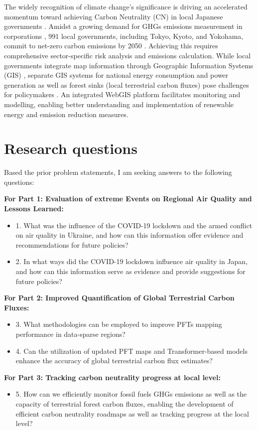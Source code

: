 The widely recognition of climate change's significance \citep{primack2009impact, watanabe2009general, ogawa2013ecological, shibuya2016effect} is driving an accelerated momentum toward achieving Carbon Neutrality (CN) in local Japanese governments \citep{nakazawa2023net}. Amidst a growing demand for GHGs emissions measurement in corporations \citep{kauffmann2012corporate}, 991 local governments, including Tokyo, Kyoto, and Yokohama, commit to net-zero carbon emissions by 2050 \citep{zerocarboncities}. Achieving this requires comprehensive sector-specific risk analysis and emissions calculation. While local governments integrate map information through Geographic Information Systems (GIS) \citep{nikkei}, separate GIS systems for national energy consumption and power generation as well as forest sinks (local terrestrial carbon fluxes) pose challenges for policymakers \citep{Toshihiko, kitamoto, nlftp}. An integrated WebGIS platform facilitates monitoring and modelling, enabling better understanding and implementation of renewable energy and emission reduction measures. \par
\section{Research questions}
Based the prior problem statements, I am seeking answers to the following questions:

\textbf{For Part 1: Evaluation of extreme Events on Regional Air Quality and Lessons Learned:}
\begin{itemize}
    \item 1. What was the influence of the COVID-19 lockdown and the armed conflict on air quality in Ukraine, and how can this information offer evidence and recommendations for future policies?
    \item 2. In what ways did the COVID-19 lockdown influence air quality in Japan, and how can this information serve as evidence and provide suggestions for future policies?
\end{itemize}

\textbf{For Part 2: Improved Quantification of Global Terrestrial Carbon Fluxes:}
\begin{itemize}
    \item 3. What methodologies can be employed to improve PFTs mapping performance in data-sparse regions?
    \item 4. Can the utilization of updated PFT maps and Transformer-based models enhance the accuracy of global terrestrial carbon flux estimates?
\end{itemize}
\textbf{For Part 3: Tracking carbon neutrality progress at local level:}
\begin{itemize}
    \item 5. How can we efficiently monitor fossil fuels GHGs emissions as well as the capacity of terrestrial forest carbon fluxes, enabling the development of efficient carbon neutrality roadmaps as well as tracking progress at the local level?
\end{itemize}

